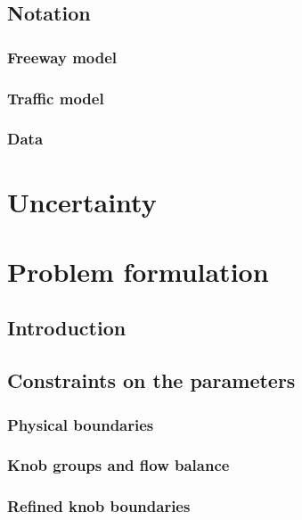 \subsection{Notation}
\subsubsection{Freeway model}

\label{subsubsec:freeway_notation}
\subsubsection{Traffic model}
\label{subsubsec:traffic_notation}

\subsubsection{Data}
\label{subsubsec:data_notation}



\section{Uncertainty}
\label{sec:uncertainty}



\section{Problem formulation}
\subsection{Introduction}
\label{subsec:problem_formulation_intro}

\subsection{Constraints on the parameters}
\label{subsec:constraintsintro}

\subsubsection{Physical boundaries}
\label{subsubsec:naive}

\subsubsection{Knob groups and flow balance}
\label{subsubsec:knob_groups}

\subsubsection{Refined knob boundaries}
\label{subsubsec:refined}

